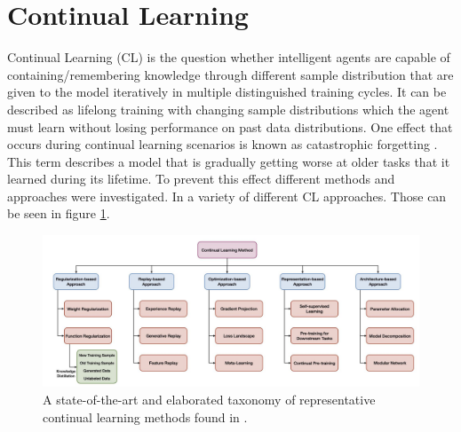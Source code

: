 \section{Continual Learning}
\label{sec:cont learning}
Continual Learning (CL) is the question whether intelligent agents are capable of containing/remembering 
knowledge through different sample distribution that are given to the model iteratively in multiple distinguished training cycles.
It can be described as lifelong training with changing sample distributions which the agent must learn without losing performance on past data distributions.
One effect that occurs during continual learning scenarios is known as catastrophic forgetting \cite{wang2023comprehensive}. 
This term describes a model that is gradually getting worse at older tasks that it learned during its lifetime. To prevent this effect different methods and approaches were investigated. In \cite{wang2023comprehensive} a variety of different CL approaches. Those can be seen in figure \ref{fig:cl_tax}.
\begin{figure}[h!]
    \centering
    \includegraphics[width=\textwidth]{images/cl_taxonomie.JPG}
    \caption{A state-of-the-art and elaborated taxonomy of representative continual learning methods found in \cite{wang2023comprehensive}.}
    \label{fig:cl_tax}
\end{figure}